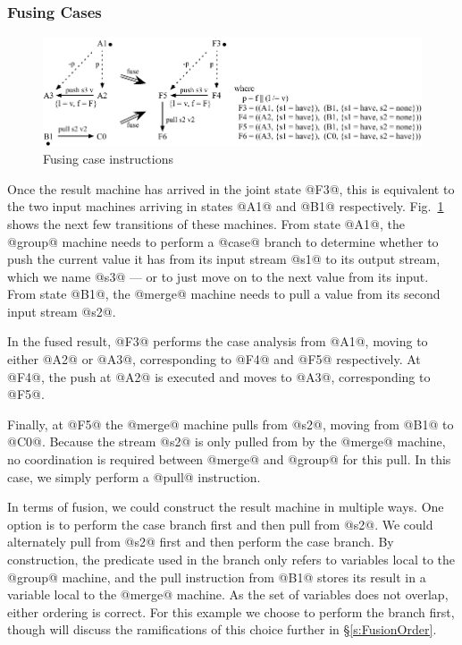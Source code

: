 \eject{}
\subsubsection{Fusing Cases}
\begin{figure}
\includegraphics[scale=1.1]{figures/fuse-case-pull.pdf}
\caption{Fusing case instructions}
\label{fig:Fusion:Case}
\end{figure}

Once the result machine has arrived in the joint state @F3@, this is equivalent to the two input machines arriving in states @A1@ and @B1@ respectively.
Fig.~\ref{fig:Fusion:Case} shows the next few transitions of these machines.
From state @A1@, the @group@ machine needs to perform a @case@ branch to determine whether to push the current value it has from its input stream @s1@ to its output stream, which we name @s3@ --- or to just move on to the next value from its input.
From state @B1@, the @merge@ machine needs to pull a value from its second input stream @s2@. 

In the fused result, @F3@ performs the case analysis from @A1@, moving to either @A2@ or @A3@, corresponding to @F4@ and @F5@ respectively.
At @F4@, the push at @A2@ is executed and moves to @A3@, corresponding to @F5@.

Finally, at @F5@ the @merge@ machine pulls from @s2@, moving from @B1@ to @C0@.
Because the stream @s2@ is only pulled from by the @merge@ machine, no coordination is required between @merge@ and @group@ for this pull.
In this case, we simply perform a @pull@ instruction.

In terms of fusion, we could construct the result machine in multiple ways.
One option is to perform the case branch first and then pull from @s2@.
We could alternately pull from @s2@ first and then perform the case branch.
By construction, the predicate used in the branch only refers to variables local to the @group@ machine, and the pull instruction from @B1@ stores its result in a variable local to the @merge@ machine.
As the set of variables does not overlap, either ordering is correct.
For this example we choose to perform the branch first, though will discuss the ramifications of this choice further in \S\ref{s:FusionOrder}.


